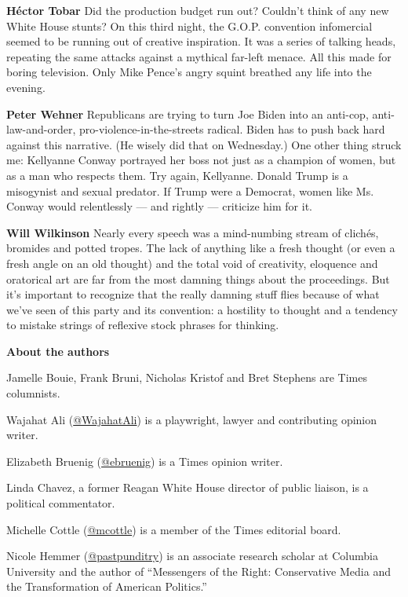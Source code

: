 \textbf{Héctor Tobar} Did the production budget run out? Couldn't think
of any new White House stunts? On this third night, the G.O.P.
convention infomercial seemed to be running out of creative inspiration.
It was a series of talking heads, repeating the same attacks against a
mythical far-left menace. All this made for boring television. Only Mike
Pence's angry squint breathed any life into the evening.

\textbf{Peter Wehner} Republicans are trying to turn Joe Biden into an
anti-cop, anti-law-and-order, pro-violence-in-the-streets radical. Biden
has to push back hard against this narrative. (He wisely did that on
Wednesday.) One other thing struck me: Kellyanne Conway portrayed her
boss not just as a champion of women, but as a man who respects them.
Try again, Kellyanne. Donald Trump is a misogynist and sexual predator.
If Trump were a Democrat, women like Ms. Conway would relentlessly ---
and rightly --- criticize him for it.

\textbf{Will Wilkinson} Nearly every speech was a mind-numbing stream of
clichés, bromides and potted tropes. The lack of anything like a fresh
thought (or even a fresh angle on an old thought) and the total void of
creativity, eloquence and oratorical art are far from the most damning
things about the proceedings. But it's important to recognize that the
really damning stuff flies because of what we've seen of this party and
its convention: a hostility to thought and a tendency to mistake strings
of reflexive stock phrases for thinking.

\textbf{About the authors}

Jamelle Bouie, Frank Bruni, Nicholas Kristof and Bret Stephens are Times
columnists.

Wajahat Ali
(\href{https://twitter.com/WajahatAli?ref_src=twsrc\%5Egoogle\%7Ctwcamp\%5Eserp\%7Ctwgr\%5Eauthor}{@WajahatAli})
is a playwright, lawyer and contributing opinion writer.

Elizabeth Bruenig (\href{https://twitter.com/ebruenig}{@ebruenig}) is a
Times opinion writer.

Linda Chavez, a former Reagan White House director of public liaison, is
a political commentator.

Michelle Cottle (\href{https://twitter.com/mcottle}{@mcottle}) is a
member of the Times editorial board.

Nicole Hemmer
(\href{https://twitter.com/pastpunditry?ref_src=twsrc\%5Egoogle\%7Ctwcamp\%5Eserp\%7Ctwgr\%5Eauthor}{@pastpunditry})
is an associate research scholar at Columbia University and the author
of ``Messengers of the Right: Conservative Media and the Transformation
of American Politics.''

